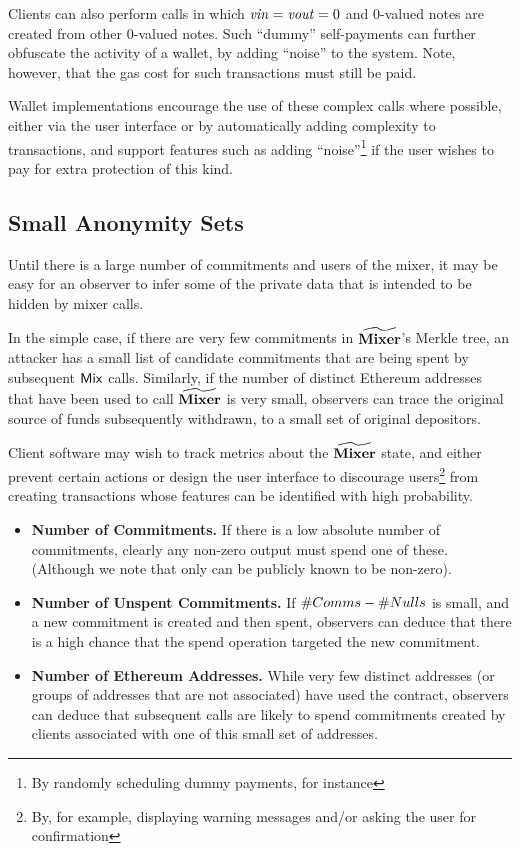 Clients can also perform \mix{} calls in which $\mathit{vin} = \mathit{vout} = 0$ and 0-valued notes are created from other 0-valued notes. Such ``dummy'' self-payments can further obfuscate the activity of a wallet, by adding ``noise'' to the system. Note, however, that the gas cost for such transactions must still be paid.

Wallet implementations \SHOULD{} encourage the use of these complex calls where possible, either via the user interface or by automatically adding complexity to transactions, and \SHOULD{} support features such as adding ``noise''\footnote{By randomly scheduling dummy payments, for instance} if the user wishes to pay for extra protection of this kind.

\subsection{Small Anonymity Sets}

Until there is a large number of commitments and users of the mixer, it may be easy for an observer to infer some of the private data that is intended to be hidden by mixer calls.

In the simple case, if there are very few commitments in $\widetilde{\mathbf{Mixer}}$'s Merkle tree, an attacker has a small list of candidate commitments that are being spent by subsequent $\mathsf{Mix}$ calls. Similarly, if the number of distinct Ethereum addresses that have been used to call $\widetilde{\mathbf{Mixer}}$ is very small, observers can trace the original source of funds subsequently withdrawn, to a small set of original depositors.

Client software may wish to track metrics about the $\widetilde{\mathbf{Mixer}}$ state, and either prevent certain actions or design the user interface to discourage users\footnote{By, for example, displaying warning messages and/or asking the user for confirmation} from creating transactions whose features can be identified with high probability.

\begin{itemize}
\item \textbf{Number of Commitments.} If there is a low absolute number of commitments, clearly any non-zero output must spend one of these. (Although we note that only \vout{} can be publicly known to be non-zero).
\item \textbf{Number of Unspent Commitments.} If $\#{Comms} - \#{Nulls}$ is small, and a new commitment is created and then spent, observers can deduce that there is a high chance that the spend operation targeted the new commitment.
\item \textbf{Number of Ethereum Addresses.} While very few distinct addresses (or groups of addresses that are not associated) have used the contract, observers can deduce that subsequent \mix{} calls are likely to spend commitments created by clients associated with one of this small set of addresses.
\end{itemize}

